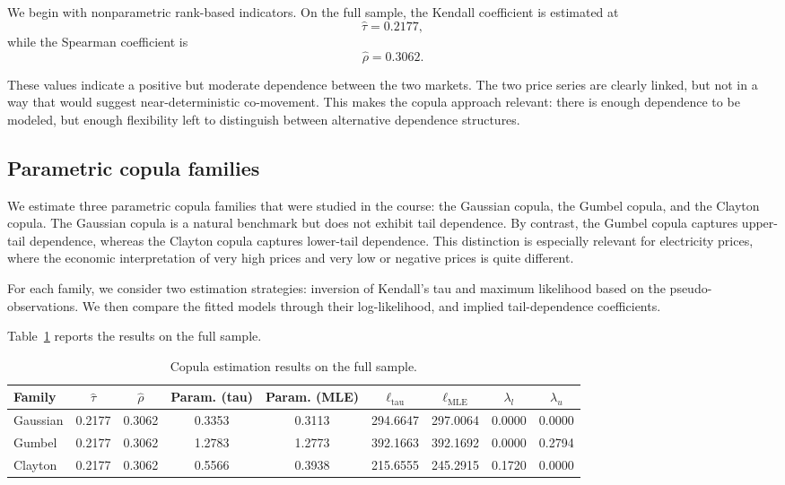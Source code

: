 We begin with nonparametric rank-based indicators. On the full sample, the Kendall coefficient is estimated at
\[
\hat\tau = 0.2177,
\]
while the Spearman coefficient is
\[
\hat\rho = 0.3062.
\]

These values indicate a positive but moderate dependence between the two markets. The two price series are clearly linked, but not in a way that would suggest near-deterministic co-movement. This makes the copula approach relevant: there is enough dependence to be modeled, but enough flexibility left to distinguish between alternative dependence structures.

\subsection{Parametric copula families}

We estimate three parametric copula families that were studied in the course: the Gaussian copula, the Gumbel copula, and the Clayton copula. The Gaussian copula is a natural benchmark but does not exhibit tail dependence. By contrast, the Gumbel copula captures upper-tail dependence, whereas the Clayton copula captures lower-tail dependence. This distinction is especially relevant for electricity prices, where the economic interpretation of very high prices and very low or negative prices is quite different.

For each family, we consider two estimation strategies: inversion of Kendall's tau and maximum likelihood based on the pseudo-observations. We then compare the fitted models through their log-likelihood, and implied tail-dependence coefficients.

Table~\ref{tab:copula_full} reports the results on the full sample.

\begin{table}[H]
\centering
\caption{Copula estimation results on the full sample.}
\label{tab:copula_full}
\begin{tabular}{lcccccccc}
\toprule
Family & \(\hat\tau\) & \(\hat\rho\) & Param. (tau) & Param. (MLE) & \(\ell_{\text{tau}}\) & \(\ell_{\text{MLE}}\) & \(\lambda_l\) & \(\lambda_u\) \\
\midrule
Gaussian & 0.2177 & 0.3062 & 0.3353 & 0.3113 & 294.6647 & 297.0064 & 0.0000 & 0.0000 \\
Gumbel   & 0.2177 & 0.3062 & 1.2783 & 1.2773 & 392.1663 & 392.1692 & 0.0000 & 0.2794 \\
Clayton  & 0.2177 & 0.3062 & 0.5566 & 0.3938 & 215.6555 & 245.2915 & 0.1720 & 0.0000 \\
\bottomrule
\end{tabular}
\end{table}

